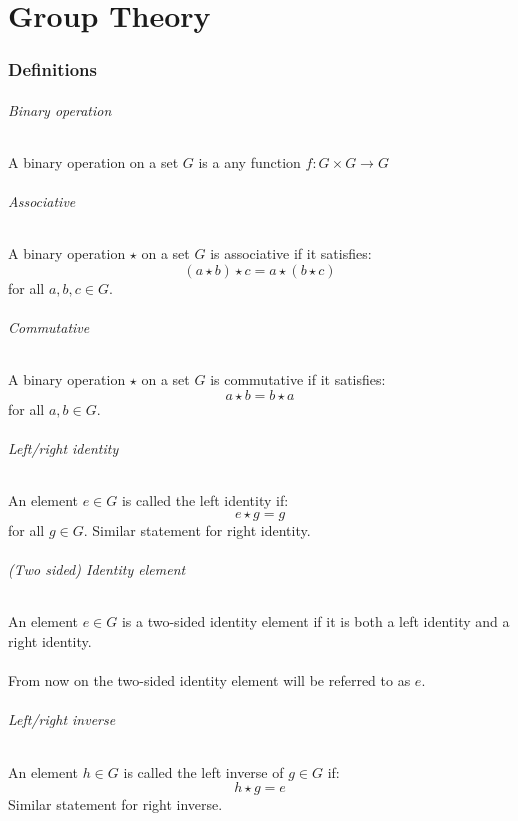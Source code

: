 \documentclass{article}
\begin{document}
\newpage
\part{Group Theory}

\section{Definitions}
\paragraph{Binary operation}
A binary operation on a set $ G $ is a any function $ f: G \times G \to G $
\paragraph{Associative}
A binary operation $ \star $ on a set $ G $ is associative if it satisfies:
\begin{equation}
(a \star b) \star c = a \star (b \star c)
\end{equation}
for all $ a, b, c \in G $.
\paragraph{Commutative}
A binary operation $ \star $ on a set $ G $ is commutative if it satisfies:
\begin{equation}
a \star b = b \star a
\end{equation}
for all $ a, b \in G $.
\paragraph{Left/right identity}
An element $ e \in G $ is called the left identity if:
\begin{equation}
e \star g = g
\end{equation}
for all $ g \in G $. Similar statement for right identity.
\paragraph{(Two sided) Identity element}
An element $ e \in G $ is a two-sided identity element if it is both a left identity and a right identity.
\\\\
From now on the two-sided identity element will be referred to as $ e $.
\paragraph{Left/right inverse}
An element $ h \in G $ is called the left inverse  of $ g \in G $ if:
\begin{equation}
h \star g = e
\end{equation}
Similar statement for right inverse.
\end{document}
